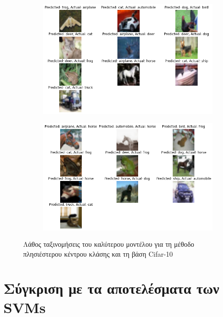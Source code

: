 \documentclass[a4paper]{article}
\begin{document}
\begin{figure}[H]
    \centering

    \begin{subfigure}[t]{0.48\linewidth}
    \includegraphics[width=\linewidth]{cifar/wrong_results_knn_1.png}
    \end{subfigure}
    \begin{subfigure}[t]{0.48\linewidth}
    \includegraphics[width=\linewidth]{cifar/wrong_results_knn_2.png}
    \end{subfigure}

    \caption{Λάθος ταξινομήσεις του καλύτερου μοντέλου για τη μέθοδο
    πλησιέστερου κέντρου κλάσης και τη βάση Cifar-10}
    \label{fig:cifar_wrong_nc}
\end{figure}

\section{Σύγκριση με τα αποτελέσματα των SVMs}
\end{document}

